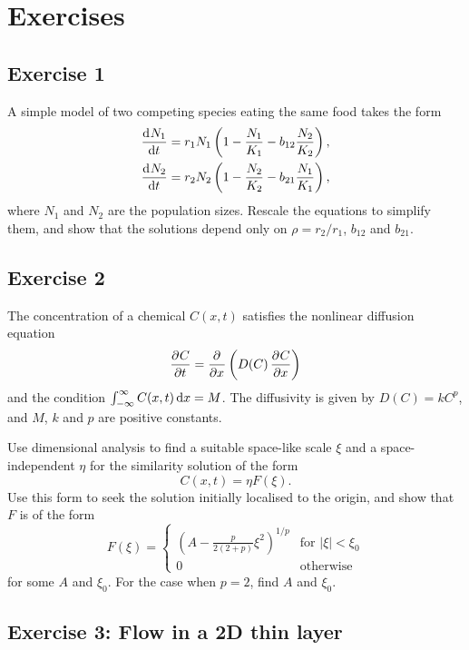 \documentclass{article}
\begin{document}
\section{Exercises}

\subsection{Exercise 1} 

A simple model of two competing species eating the same food takes the form
\begin{align*}
 \dod{N_1}{t} &= r_1 N_1 \left( 1 - \frac{N_1}{K_1} - b_{12} \frac{N_2}{K_2} \right), \\
 \dod{N_2}{t} &= r_2 N_2 \left( 1 - \frac{N_2}{K_2} - b_{21} \frac{N_1}{K_1} \right), \\
\end{align*}
where $N_1$ and $N_2$ are the population sizes. Rescale the equations to
simplify them, and show that the solutions depend only on $\rho = r_2/r_1$,
$b_{12}$ and $b_{21}$. 

\subsection{Exercise 2}


The concentration of a chemical $C(x,t)$ satisfies the nonlinear diffusion
equation
$$ \dpd{C}{t} = \dpd{}{x}\left(D(C)\dpd{C}{x}\right) $$
and the condition $\int_{-\infty}^\infty C(x,t) \dif x = M$. The diffusivity is
given by $D(C) = kC^p$, and $M$, $k$ and $p$ are positive constants. 

Use dimensional analysis to find a suitable space-like scale $\xi$ and a
space-independent $\eta$ for the similarity solution of the form 
$$ C(x,t) = \eta F(\xi). $$
Use this form to seek the solution initially localised to the origin, and show
that $F$ is of the form
$$ F(\xi) = \begin{cases}
 \left( A - \frac{p}{2(2+p)} \xi^2 \right)^{1/p} & \text{for $|\xi| < \xi_0$} \\
 0 & \text{otherwise}
\end{cases} $$
for some $A$ and $\xi_0$. For the case when $p=2$, find $A$ and $\xi_0$. 

\subsection{Exercise 3: Flow in a 2D thin layer}
\end{document}
